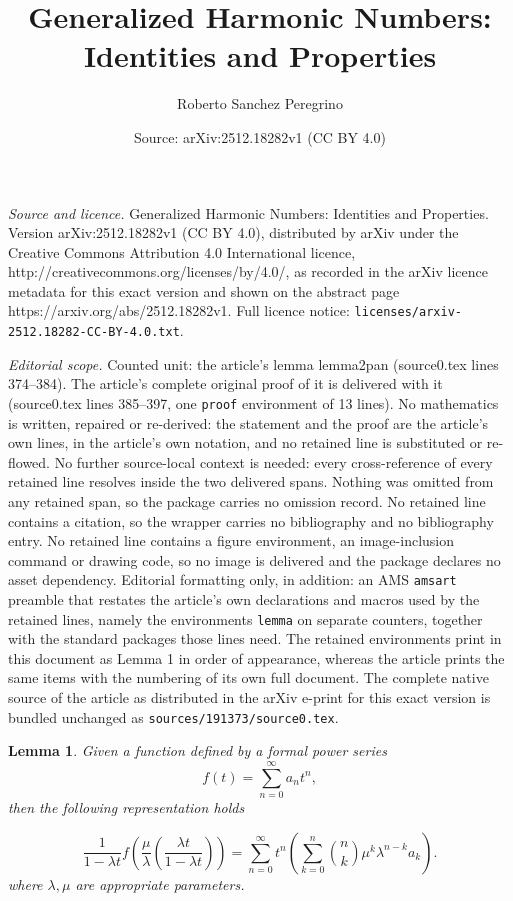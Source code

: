 \documentclass[10pt,a4paper]{amsart}
\title{Generalized Harmonic Numbers: Identities and Properties}
\author{Roberto Sanchez Peregrino}
\date{Source: arXiv:2512.18282v1 (CC BY 4.0)}
\newtheorem{lemma}{Lemma}
\begin{document}
\maketitle

\noindent\emph{Source and licence.} Generalized Harmonic Numbers: Identities and Properties. Version arXiv:2512.18282v1 (CC BY 4.0), distributed by arXiv under the Creative Commons Attribution 4.0 International licence, http://creativecommons.org/licenses/by/4.0/, as recorded in the arXiv licence metadata for this exact version and shown on the abstract page https://arxiv.org/abs/2512.18282v1. Full licence notice: \texttt{licenses/arxiv-2512.18282-CC-BY-4.0.txt}.\par\smallskip

\noindent\textit{Editorial scope.} Counted unit: the article's lemma lemma2pan (source0.tex lines 374--384). The article's complete original proof of it is delivered with it (source0.tex lines 385--397, one \texttt{proof} environment of 13 lines). No mathematics is written, repaired or re-derived: the statement and the proof are the article's own lines, in the article's own notation, and no retained line is substituted or re-flowed.  No further source-local context is needed: every cross-reference of every retained line resolves inside the two delivered spans.  Nothing was omitted from any retained span, so the package carries no omission record.  No retained line contains a citation, so the wrapper carries no bibliography and no bibliography entry.  No retained line contains a figure environment, an image-inclusion command or drawing code, so no image is delivered and the package declares no asset dependency.  Editorial formatting only, in addition: an AMS \texttt{amsart} preamble that restates the article's own declarations and macros used by the retained lines, namely the environments \texttt{lemma} on separate counters, together with the standard packages those lines need.  The retained environments print in this document as Lemma 1 in order of appearance, whereas the article prints the same items with the numbering of its own full document.  The complete native source of the article as distributed in the arXiv e-print for this exact version is bundled unchanged as \texttt{sources/191373/source0.tex}.
\begin{lemma}\label{lemma2pan}
Given a function defined by a formal power series
$$f(t)=\sum_{n=0}^{\infty}a_nt^n,$$
 then the following representation holds

\begin{equation}
\frac{1}{1-\lambda t}f\left(\frac{\mu}{\lambda}\left(\frac{\lambda t}{1-\lambda t}\right)\right)=\sum_{n=0}^{\infty}t^n\left( \sum_{k=0}^{n}
\binom{n}{k}{\mu}^k{\lambda}^{n-k}a_k\right).\label{panequa1}
\end{equation}
where $\lambda,\mu$ are appropriate parameters.
\end{lemma}
\end{document}
